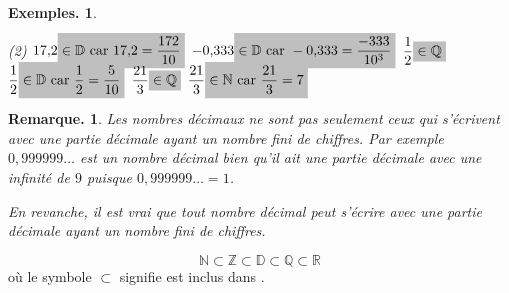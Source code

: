 \documentclass[12pt]{article}
\theoremstyle{break}
\newtheorem*{examples}{Exemples.}
\newtheorem*{remark}{Remarque.}
\begin{document}
\begin{examples}
  \begin{tasks}[label=\textbullet](2)
    \task $17{,}2\hideM{ \in \mathbb{D} \text{ car } 17{,}2 = \dfrac{172}{10}}$
    \task $-0{,}333\hideM{ \in \mathbb{D} \text{ car } -0{,}333 = \dfrac{-333}{10^3}}$
    \task $\dfrac{1}{2}\hideM{ \in \mathbb{Q}}$
    \task $\dfrac{1}{2}\hideM{ \in \mathbb{D} \text{ car } \dfrac{1}{2} = \dfrac{5}{10}}$
    \task $\dfrac{21}{3}\hideM{ \in \mathbb{Q}}$
    \task $\dfrac{21}{3}\hideM{ \in \mathbb{N} \text{ car } \dfrac{21}{3} = 7}$
  \end{tasks}
\end{examples}

\begin{remark}
  Les nombres décimaux ne sont pas seulement ceux qui s'écrivent avec une partie décimale ayant un nombre fini de chiffres. Par exemple $0{,}999999\ldots$ est un nombre décimal bien qu'il ait une partie décimale avec une infinité de $9$ puisque $0{,}999999\ldots = 1$.

  En revanche, il est vrai que tout nombre décimal peut s'écrire avec une partie décimale ayant un nombre fini de chiffres.
\end{remark}

\begin{proposition}{}{}
  \begin{multihide}
  $$\mathbb{N} \subset \mathbb{Z} \subset \mathbb{D} \subset \mathbb{Q} \subset \mathbb{R}$$
  où le symbole $\subset$ signifie \og est inclus dans \fg{}.
  \end{multihide}
\end{proposition}
\end{document}
